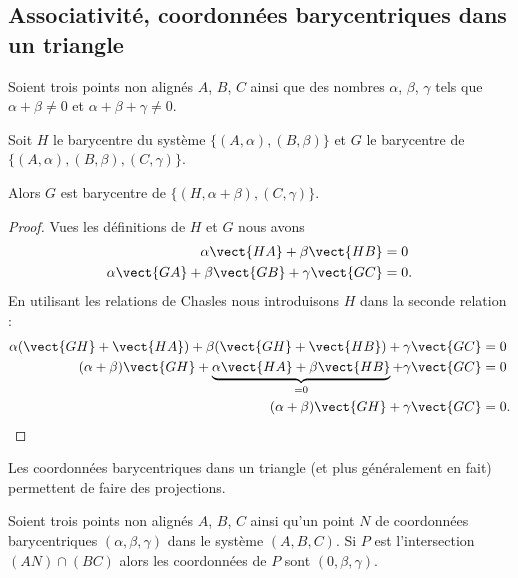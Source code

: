 \subsection{Associativité, coordonnées barycentriques dans un triangle}

\begin{lemma}
	Soient trois points non alignés \( A\), \( B\), \( C\) ainsi que des nombres \( \alpha\), \( \beta\), \( \gamma\) tels que \( \alpha+\beta\neq 0 \) et \( \alpha+\beta+\gamma\neq 0\).

	Soit \( H\) le barycentre du système \( \{ (A,\alpha),(B,\beta) \}\) et \( G\) le barycentre de \( \{ (A,\alpha), (B,\beta),(C,\gamma) \}\).

	Alors \( G\) est barycentre de \( \{ (H,\alpha+\beta),(C,\gamma) \}\).
\end{lemma}

\begin{proof}
	Vues les définitions de \( H\) et \( G\) nous avons
	\begin{subequations}
		\begin{align}
			\alpha\vect{ HA }+\beta\vect{ HB }                   & =0  \\
			\alpha\vect{ GA }+\beta\vect{ GB }+\gamma\vect{ GC } & =0.
		\end{align}
	\end{subequations}
	En utilisant les relations de Chasles nous introduisons \( H\) dans la seconde relation :
	\begin{subequations}
		\begin{align}
			\alpha(\vect{ GH }+\vect{ HA })+\beta(\vect{ GH }+\vect{ HB })+\gamma\vect{ GC }                      & =0  \\
			(\alpha+\beta)\vect{ GH }+\underbrace{  \alpha\vect{ HA }+\beta\vect{ HB }   }_{=0}+\gamma\vect{ GC } & =0  \\
			(\alpha+\beta)\vect{ GH }+\gamma\vect{ GC }                                                           & =0.
		\end{align}
	\end{subequations}
\end{proof}

Les coordonnées barycentriques dans un triangle (et plus généralement en fait) permettent de faire des projections.

\begin{proposition}     \label{PROPooBCUVooWKttiH}
	Soient trois points non alignés \( A\), \( B\), \( C\) ainsi qu'un point \( N\) de coordonnées barycentriques  \( (\alpha,\beta,\gamma) \) dans le système \( (A,B,C)\). Si \( P\) est l'intersection \( (AN)\cap(BC)\) alors les coordonnées de \( P\) sont \( (0,\beta,\gamma)\).
\end{proposition}

